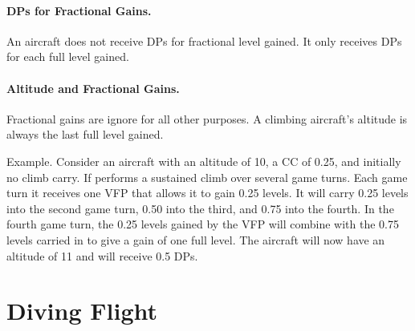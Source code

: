{\paragraph{DPs for Fractional Gains.}
An aircraft does not receive DPs for fractional level gained. It only receives DPs for each full level gained.

\paragraph{Altitude and Fractional Gains.}
Fractional gains are ignore for all other purposes. A climbing aircraft's altitude is always the last full level gained.

Example. Consider an aircraft with an altitude of 10, a CC of 0.25, and initially no climb carry. If performs a sustained climb over several game turns. Each game turn it receives one VFP that allows it to gain 0.25 levels. It will carry 0.25 levels into the second game turn, 0.50 into the third, and 0.75 into the fourth. In the fourth game turn, the 0.25 levels gained by the VFP will combine with the 0.75 levels carried in to give a gain of one full level. The aircraft will now have an altitude of 11 and will receive 0.5 DPs.

}


\section{Diving Flight}
\label{rule:diving-flight}

